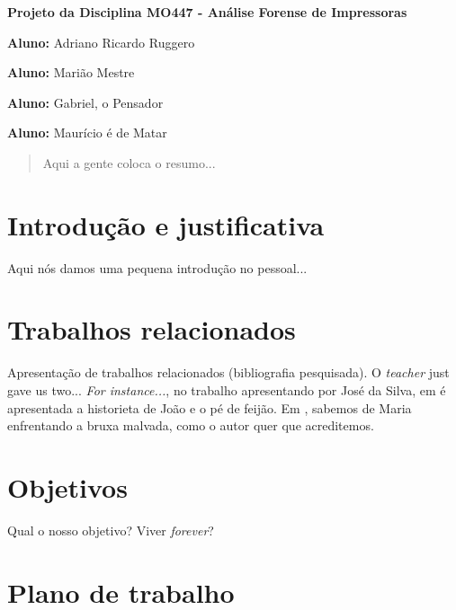 \documentclass[12pt,twoside,a4paper]{article}
\begin{document}
\vskip 15mm

\begin{center} 
\textbf{Projeto da Disciplina MO447 - Análise Forense de Impressoras}

\end{center}

\vskip 5mm

\textbf{Aluno:} Adriano Ricardo Ruggero

\textbf{Aluno:} Marião Mestre

\textbf{Aluno:} Gabriel, o Pensador

\textbf{Aluno:} Maurício é de Matar

\vskip 20mm

\begin{abstract}

Aqui a gente coloca o resumo...

\end{abstract}

\newpage
\pagestyle{plain}
\headheight 0.0cm
\headsep 0.0cm
\footskip 2.2cm

\section{Introdução e justificativa}
\label{sec:introduction}

Aqui nós damos uma pequena introdução no pessoal...

\section{Trabalhos relacionados}
\label{sec:related}

Apresentação de trabalhos relacionados (bibliografia pesquisada).	O \textit{teacher} just gave us two... \textit{For instance...}, no trabalho apresentando por José da Silva, em \cite{Bulan} é apresentada a historieta de João e o pé de feijão. Em \cite{Kee}, sabemos de Maria enfrentando a bruxa malvada, como o autor quer que acreditemos. 


\section{Objetivos}
\label{sec:objects}

Qual o nosso objetivo? Viver \textit{forever}?

\section{Plano de trabalho}
\label{sec:plan}
\end{document}
